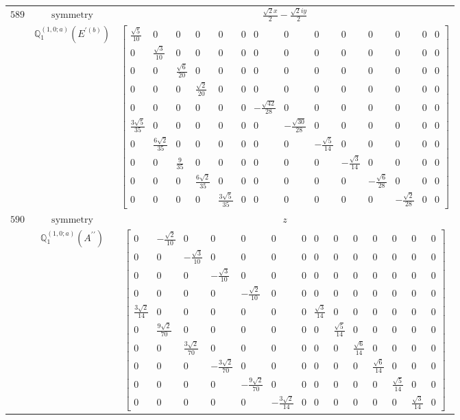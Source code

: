 \documentclass[fleqn,8pt,landscape]{jsarticle}
\begin{document}
\begin{longtable}{ccc}
$ 589 $ & $ \text{symmetry} $ & $ \frac{\sqrt{2} x}{2} - \frac{\sqrt{2} i y}{2} $ \\
$  $ & $ \mathbb{Q}_{1}^{(1,0;a)}(E^{\prime(b)}) $ & $ \begin{bmatrix} \frac{\sqrt{5}}{10} & 0 & 0 & 0 & 0 & 0 & 0 & 0 & 0 & 0 & 0 & 0 & 0 & 0 \\ 0 & \frac{\sqrt{3}}{10} & 0 & 0 & 0 & 0 & 0 & 0 & 0 & 0 & 0 & 0 & 0 & 0 \\ 0 & 0 & \frac{\sqrt{6}}{20} & 0 & 0 & 0 & 0 & 0 & 0 & 0 & 0 & 0 & 0 & 0 \\ 0 & 0 & 0 & \frac{\sqrt{2}}{20} & 0 & 0 & 0 & 0 & 0 & 0 & 0 & 0 & 0 & 0 \\ 0 & 0 & 0 & 0 & 0 & 0 & - \frac{\sqrt{42}}{28} & 0 & 0 & 0 & 0 & 0 & 0 & 0 \\ \frac{3 \sqrt{5}}{35} & 0 & 0 & 0 & 0 & 0 & 0 & - \frac{\sqrt{30}}{28} & 0 & 0 & 0 & 0 & 0 & 0 \\ 0 & \frac{6 \sqrt{2}}{35} & 0 & 0 & 0 & 0 & 0 & 0 & - \frac{\sqrt{5}}{14} & 0 & 0 & 0 & 0 & 0 \\ 0 & 0 & \frac{9}{35} & 0 & 0 & 0 & 0 & 0 & 0 & - \frac{\sqrt{3}}{14} & 0 & 0 & 0 & 0 \\ 0 & 0 & 0 & \frac{6 \sqrt{2}}{35} & 0 & 0 & 0 & 0 & 0 & 0 & - \frac{\sqrt{6}}{28} & 0 & 0 & 0 \\ 0 & 0 & 0 & 0 & \frac{3 \sqrt{5}}{35} & 0 & 0 & 0 & 0 & 0 & 0 & - \frac{\sqrt{2}}{28} & 0 & 0 \end{bmatrix} $ \\ \hline
$ 590 $ & $ \text{symmetry} $ & $ z $ \\
$  $ & $ \mathbb{Q}_{1}^{(1,0;a)}(A^{\prime\prime}) $ & $ \begin{bmatrix} 0 & - \frac{\sqrt{2}}{10} & 0 & 0 & 0 & 0 & 0 & 0 & 0 & 0 & 0 & 0 & 0 & 0 \\ 0 & 0 & - \frac{\sqrt{3}}{10} & 0 & 0 & 0 & 0 & 0 & 0 & 0 & 0 & 0 & 0 & 0 \\ 0 & 0 & 0 & - \frac{\sqrt{3}}{10} & 0 & 0 & 0 & 0 & 0 & 0 & 0 & 0 & 0 & 0 \\ 0 & 0 & 0 & 0 & - \frac{\sqrt{2}}{10} & 0 & 0 & 0 & 0 & 0 & 0 & 0 & 0 & 0 \\ \frac{3 \sqrt{2}}{14} & 0 & 0 & 0 & 0 & 0 & 0 & \frac{\sqrt{3}}{14} & 0 & 0 & 0 & 0 & 0 & 0 \\ 0 & \frac{9 \sqrt{2}}{70} & 0 & 0 & 0 & 0 & 0 & 0 & \frac{\sqrt{5}}{14} & 0 & 0 & 0 & 0 & 0 \\ 0 & 0 & \frac{3 \sqrt{2}}{70} & 0 & 0 & 0 & 0 & 0 & 0 & \frac{\sqrt{6}}{14} & 0 & 0 & 0 & 0 \\ 0 & 0 & 0 & - \frac{3 \sqrt{2}}{70} & 0 & 0 & 0 & 0 & 0 & 0 & \frac{\sqrt{6}}{14} & 0 & 0 & 0 \\ 0 & 0 & 0 & 0 & - \frac{9 \sqrt{2}}{70} & 0 & 0 & 0 & 0 & 0 & 0 & \frac{\sqrt{5}}{14} & 0 & 0 \\ 0 & 0 & 0 & 0 & 0 & - \frac{3 \sqrt{2}}{14} & 0 & 0 & 0 & 0 & 0 & 0 & \frac{\sqrt{3}}{14} & 0 \end{bmatrix} $ \\ \hline

\end{longtable}
\end{document}

